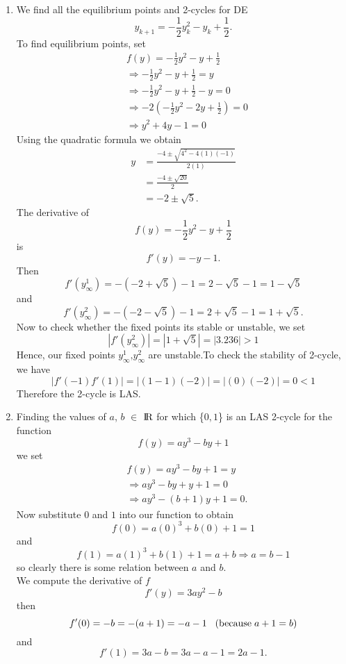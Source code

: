 \documentclass[12pt]{article}
\begin{document}
\begin{enumerate}
\item We find all the equilibrium points and 2-cycles for DE\\
\[y_{k+1}=-\frac{1}{2}y^2_k-y_k+\frac{1}{2}.\]
To find equilibrium points, set
\begin{align*}
&f(y)=-\frac{1}{2}y^2-y+\frac{1}{2}\\
&\Rightarrow -\frac{1}{2}y^2-y+\frac{1}{2}=y\\
&\Rightarrow -\frac{1}{2}y^2-y+\frac{1}{2}-y=0\\
&\Rightarrow -2(-\frac{1}{2}y^2-2y+\frac{1}{2})=0\\
&\Rightarrow y^2+4y-1=0
\end{align*}
Using the quadratic formula we obtain
\begin{align*}
y&=\frac{-4 \pm \sqrt{4^2-4(1)(-1)}}{2(1)} \\
&=\frac{-4 \pm \sqrt{20}}{2}\\
&=\boxed{-2 \pm \sqrt{5}}.
\end{align*}
The derivative of
\[f(y)=-\frac{1}{2}y^2-y+\frac{1}{2}\]
is
\[\boxed{f'(y)=-y-1}.\]
Then
\[f'(y^1_\infty)=-(-2+\sqrt{5})-1=2-\sqrt{5}-1=1-\sqrt{5}\]
and 
\[f'(y^2_\infty)=-(-2-\sqrt{5})-1=2+\sqrt{5}-1=1+\sqrt{5}.\]
Now to check whether the fixed points its stable or unstable, we set
\[\left|f'(y^2_\infty )\right|=\left|1+\sqrt{5}\right|=\left|3.236\right|>1\]
Hence, our fixed points $y^1_\infty \mbox{,} y^2_\infty$ are unstable.To check the stability of 2-cycle, we have
\[\left| f'(-1)f'(1)\right|= \left|(1-1)(-2)\right|=\left|(0)(-2)\right|=\boxed{0<1}\]
Therefore the 2-cycle is LAS.

\cleardoublepage 



\item Finding the values of $a$, $b$ $\in$  $\rm I\!R$ for which \{$0,1$\} is an LAS 2-cycle for the function
\[f(y)=ay^3-by+1\]
we set
\begin{align*}
&f(y)=ay^3-by+1=y\\
&\Rightarrow ay^3-by+y+1=0\\
&\Rightarrow  ay^3-(b+1)y+1=0.
\end{align*}
Now substitute $0$ and $1$ into our function to obtain
\[f(0)=a(0)^3+b(0)+1=1\]
and
\[f(1)=a(1)^3+b(1)+1=a+b\Rightarrow a=b-1\]
so clearly there is some relation between $a$ and $b$.\\

We compute the derivative of $f$  
\[f'(y)=3ay^2-b\]
then
\[f'(0)=-b=-(a+1)=-a-1\hspace{0.3cm} (\mbox{because} \hspace{0.1cm}a+1=b)\]
and
\[f'(1)=3a-b=3a-a-1=2a-1.\]


\end{enumerate}
\end{document}

